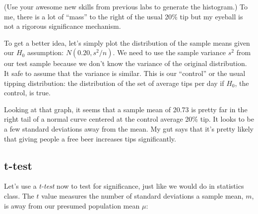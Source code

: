\begin{fullwidth}
(Use your awesome new skills from previous labs to generate the histogram.) To me, there is a lot of ``mass'' to the right of the usual 20\% tip but my eyeball is not a rigorous significance mechanism. 

\step To get a better idea, let's simply plot the distribution of the sample means given our $H_0$ assumption: $N(0.20, s^2/n)$.  We need to use the sample variance $s^2$ from our test sample because we don't know the variance of the original distribution. It safe to assume that the variance is similar. This is our ``control'' or the usual tipping distribution: the distribution of the set of average tips per day if $H_0$, the control, is true.


Looking at that graph, it seems that a sample mean of 20.73 is pretty far in the right tail of a normal curve centered at the control average 20\% tip. It looks to be a few standard deviations away from the mean. My gut says that it's pretty likely that giving people a free beer increases tips significantly.

\subsection{t-test}

\setcounter{problem}{1}

\step Let's use a {\em t-test} now to test for significance, just like we would do in statistics class. The $t$ value measures the number of standard deviations a sample mean, $m$, is away from our presumed population mean $\mu$: \\


\end{fullwidth}
